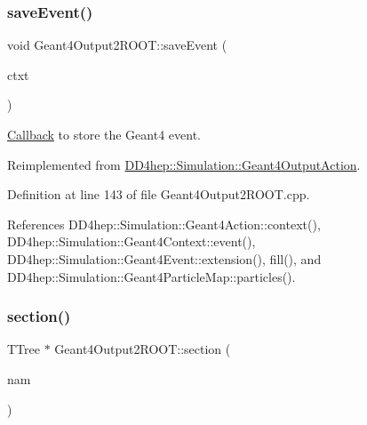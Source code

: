 \subsubsection{\texorpdfstring{save\+Event()}{saveEvent()}}
{\footnotesize\ttfamily void Geant4\+Output2\+R\+O\+O\+T\+::save\+Event (\begin{DoxyParamCaption}\item[{\hyperlink{class_d_d4hep_1_1_simulation_1_1_geant4_output_action_1_1_output_context}{Output\+Context}$<$ G4\+Event $>$ \&}]{ctxt }\end{DoxyParamCaption})\hspace{0.3cm}{\ttfamily [virtual]}}



\hyperlink{class_d_d4hep_1_1_callback}{Callback} to store the Geant4 event. 



Reimplemented from \hyperlink{class_d_d4hep_1_1_simulation_1_1_geant4_output_action_a660080e931d757573839927ca99bfbed}{D\+D4hep\+::\+Simulation\+::\+Geant4\+Output\+Action}.



Definition at line 143 of file Geant4\+Output2\+R\+O\+O\+T.\+cpp.



References D\+D4hep\+::\+Simulation\+::\+Geant4\+Action\+::context(), D\+D4hep\+::\+Simulation\+::\+Geant4\+Context\+::event(), D\+D4hep\+::\+Simulation\+::\+Geant4\+Event\+::extension(), fill(), and D\+D4hep\+::\+Simulation\+::\+Geant4\+Particle\+Map\+::particles().

\hypertarget{class_d_d4hep_1_1_simulation_1_1_geant4_output2_r_o_o_t_adc1bb7b0301e2d6ce233c3042a220a70}{}\label{class_d_d4hep_1_1_simulation_1_1_geant4_output2_r_o_o_t_adc1bb7b0301e2d6ce233c3042a220a70} 
\subsubsection{\texorpdfstring{section()}{section()}}
{\footnotesize\ttfamily T\+Tree $\ast$ Geant4\+Output2\+R\+O\+O\+T\+::section (\begin{DoxyParamCaption}\item[{const std\+::string \&}]{nam }\end{DoxyParamCaption})}



